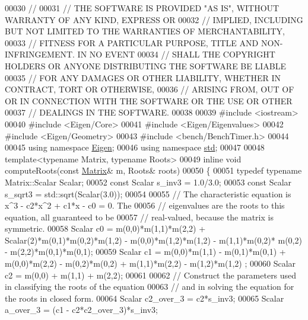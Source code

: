 \begin{DoxyCode}
00030 \textcolor{comment}{// }
00031 \textcolor{comment}{// THE SOFTWARE IS PROVIDED "AS IS", WITHOUT WARRANTY OF ANY KIND, EXPRESS OR}
00032 \textcolor{comment}{// IMPLIED, INCLUDING BUT NOT LIMITED TO THE WARRANTIES OF MERCHANTABILITY,}
00033 \textcolor{comment}{// FITNESS FOR A PARTICULAR PURPOSE, TITLE AND NON-INFRINGEMENT. IN NO EVENT}
00034 \textcolor{comment}{// SHALL THE COPYRIGHT HOLDERS OR ANYONE DISTRIBUTING THE SOFTWARE BE LIABLE}
00035 \textcolor{comment}{// FOR ANY DAMAGES OR OTHER LIABILITY, WHETHER IN CONTRACT, TORT OR OTHERWISE,}
00036 \textcolor{comment}{// ARISING FROM, OUT OF OR IN CONNECTION WITH THE SOFTWARE OR THE USE OR OTHER}
00037 \textcolor{comment}{// DEALINGS IN THE SOFTWARE.}
00038 
00039 \textcolor{preprocessor}{#include <iostream>}
00040 \textcolor{preprocessor}{#include <Eigen/Core>}
00041 \textcolor{preprocessor}{#include <Eigen/Eigenvalues>}
00042 \textcolor{preprocessor}{#include <Eigen/Geometry>}
00043 \textcolor{preprocessor}{#include <bench/BenchTimer.h>}
00044 
00045 \textcolor{keyword}{using namespace }\hyperlink{namespace_eigen}{Eigen};
00046 \textcolor{keyword}{using namespace }\hyperlink{namespacestd}{std};
00047 
00048 \textcolor{keyword}{template}<\textcolor{keyword}{typename} Matrix, \textcolor{keyword}{typename} Roots>
00049 \textcolor{keyword}{inline} \textcolor{keywordtype}{void} computeRoots(\textcolor{keyword}{const} \hyperlink{group___core___module_class_eigen_1_1_matrix}{Matrix}& m, Roots& roots)
00050 \{
00051   \textcolor{keyword}{typedef} \textcolor{keyword}{typename} Matrix::Scalar Scalar;
00052   \textcolor{keyword}{const} Scalar s\_inv3 = 1.0/3.0;
00053   \textcolor{keyword}{const} Scalar s\_sqrt3 = std::sqrt(Scalar(3.0));
00054 
00055   \textcolor{comment}{// The characteristic equation is x^3 - c2*x^2 + c1*x - c0 = 0.  The}
00056   \textcolor{comment}{// eigenvalues are the roots to this equation, all guaranteed to be}
00057   \textcolor{comment}{// real-valued, because the matrix is symmetric.}
00058   Scalar c0 = m(0,0)*m(1,1)*m(2,2) + Scalar(2)*m(0,1)*m(0,2)*m(1,2) - m(0,0)*m(1,2)*m(1,2) - m(1,1)*m(0,2)*
      m(0,2) - m(2,2)*m(0,1)*m(0,1);
00059   Scalar c1 = m(0,0)*m(1,1) - m(0,1)*m(0,1) + m(0,0)*m(2,2) - m(0,2)*m(0,2) + m(1,1)*m(2,2) - m(1,2)*m(1,2)
      ;
00060   Scalar c2 = m(0,0) + m(1,1) + m(2,2);
00061 
00062   \textcolor{comment}{// Construct the parameters used in classifying the roots of the equation}
00063   \textcolor{comment}{// and in solving the equation for the roots in closed form.}
00064   Scalar c2\_over\_3 = c2*s\_inv3;
00065   Scalar a\_over\_3 = (c1 - c2*c2\_over\_3)*s\_inv3;

\end{DoxyCode}
